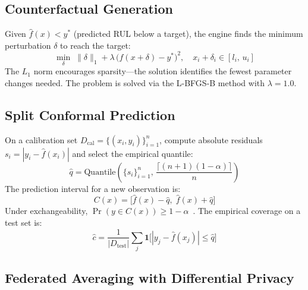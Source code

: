 \documentclass[10pt, journal, letterpaper]{IEEEtran}
\begin{document}
\subsection{Counterfactual Generation}

Given $\hat{f}(x) < y^*$ (predicted RUL below a target), the engine finds
the minimum perturbation $\delta$ to reach the target:
\begin{equation}
  \min_{\delta}\; \|\delta\|_1 + \lambda\,\bigl(\hat{f}(x+\delta) - y^*\bigr)^2,
  \quad x_i + \delta_i \in [l_i,\, u_i]
  \label{eq:cf}
\end{equation}
The $L_1$ norm encourages sparsity—the solution identifies the fewest
parameter changes needed. The problem is solved via the L-BFGS-B method
with $\lambda = 1.0$.

\subsection{Split Conformal Prediction}

On a calibration set $D_{\text{cal}} = \{(x_i, y_i)\}_{i=1}^{n}$, compute
absolute residuals $s_i = |y_i - \hat{f}(x_i)|$ and select the empirical
quantile:
\begin{equation}
  \hat{q} = \mathrm{Quantile}\!\left(\{s_i\}_{i=1}^n,\,
    \frac{\lceil(n+1)(1-\alpha)\rceil}{n}\right)
  \label{eq:quantile}
\end{equation}
The prediction interval for a new observation is:
\begin{equation}
  C(x) = \bigl[\hat{f}(x) - \hat{q},\; \hat{f}(x) + \hat{q}\bigr]
  \label{eq:interval}
\end{equation}
Under exchangeability, $\Pr(y \in C(x)) \geq 1-\alpha$~\cite{vovk2008}.
The empirical coverage on a test set is:
\begin{equation}
  \hat{c} = \frac{1}{|D_{\text{test}}|}\sum_{j}\mathbf{1}
    \!\bigl[|y_j - \hat{f}(x_j)| \leq \hat{q}\bigr]
\end{equation}

\subsection{Federated Averaging with Differential Privacy}
\end{document}
